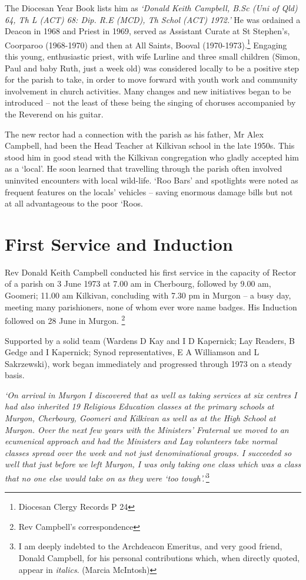 The Diocesan Year Book lists him as \emph{`Donald Keith Campbell, B.Sc (Uni of Qld) 64, Th L (ACT) 68: Dip. R.E (MCD), Th Schol (ACT) 1972.'} He was ordained a Deacon in 1968 and Priest in 1969, served as Assistant Curate at St Stephen's, Coorparoo (1968-1970) and then at All Saints, Booval (1970-1973).\footnote{Diocesan Clergy Records P 24} Engaging this young, enthusiastic priest, with wife Lurline and three small children (Simon, Paul and baby Ruth, just a week old) was considered locally to be a positive step for the parish to take, in order to move forward with youth work and community involvement in church activities. Many changes and new initiatives began to be introduced -- not the least of these being the singing of choruses accompanied by the Reverend on his guitar.

The new rector had a connection with the parish as his father, Mr Alex Campbell, had been the Head Teacher at Kilkivan school in the late 1950s. This stood him in good stead with the Kilkivan congregation who gladly accepted him as a `local'. He soon learned that travelling through the parish often involved uninvited encounters with local wild-life. `Roo Bars' and spotlights were noted as frequent features on the locals' vehicles -- saving enormous damage bills but not at all advantageous to the poor `Roos.

\hypertarget{first-service-and-induction}{%
\section{First Service and Induction}\label{first-service-and-induction}}

Rev Donald Keith Campbell conducted his first service in the capacity of Rector of a parish on 3 June 1973 at 7.00 am in Cherbourg, followed by 9.00 am, Goomeri; 11.00 am Kilkivan, concluding with 7.30 pm in Murgon -- a busy day, meeting many parishioners, none of whom ever wore name badges. His Induction followed on 28 June in Murgon. \footnote{Rev Campbell's correspondence}

Supported by a solid team (Wardens D Kay and I D Kapernick; Lay Readers, B Gedge and I Kapernick; Synod representatives, E A Williamson and L Sakrzewski), work began immediately and progressed through 1973 on a steady basis.

\emph{`On arrival in Murgon I discovered that as well as taking services at six centres I had also inherited 19 Religious Education classes at the primary schools at Murgon, Cherbourg, Goomeri and Kilkivan as well as at the High School at Murgon. Over the next few years with the Ministers' Fraternal we moved to an ecumenical approach and had the Ministers and Lay volunteers take normal classes spread over the week and not just denominational groups. I succeeded so well that just before we left Murgon, I was only taking one class which was a class that no one else would take on as they were `too tough'.'}\footnote{I am deeply indebted to the Archdeacon Emeritus, and very good friend, Donald Campbell, for his personal contributions which, when directly quoted, appear in \emph{italics}. (Marcia McIntosh)}

